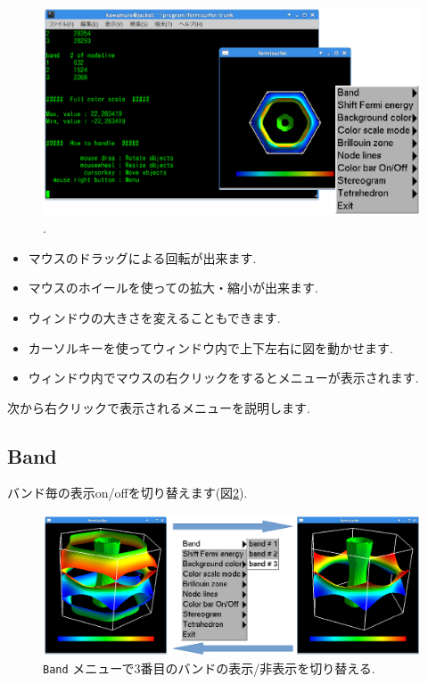 \documentclass[12pt]{jarticle}
\begin{document}
\begin{figure}[!ht]
  \includegraphics[width=17cm]{figs/start.eps}
  \caption{.}
  \label{fig_start}
\end{figure}

\begin{itemize}
\item マウスのドラッグによる回転が出来ます. 
\item マウスのホイールを使っての拡大・縮小が出来ます. 
\item ウィンドウの大きさを変えることもできます. 
\item カーソルキーを使ってウィンドウ内で上下左右に図を動かせます. 
\item ウィンドウ内でマウスの右クリックをするとメニューが表示されます. 
\end{itemize}

次から右クリックで表示されるメニューを説明します. 

\subsection{Band}

バンド毎の表示on/offを切り替えます(図\ref{fig_band}).

\begin{figure}[!ht]
  \includegraphics[width=17cm]{figs/band.eps}
  \caption{\texttt{Band} メニューで3番目のバンドの表示/非表示を切り替える.}
  \label{fig_band}
\end{figure}
\end{document}
